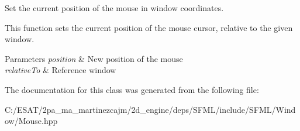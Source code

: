 Set the current position of the mouse in window coordinates. 

This function sets the current position of the mouse cursor, relative to the given window.


\begin{DoxyParams}{Parameters}
{\em position} & New position of the mouse \\
\hline
{\em relative\+To} & Reference window \\
\hline
\end{DoxyParams}


The documentation for this class was generated from the following file\+:\begin{DoxyCompactItemize}
\item 
C\+:/\+E\+S\+A\+T/2pa\+\_\+ma\+\_\+martinezcajm/2d\+\_\+engine/deps/\+S\+F\+M\+L/include/\+S\+F\+M\+L/\+Window/Mouse.\+hpp\end{DoxyCompactItemize}
